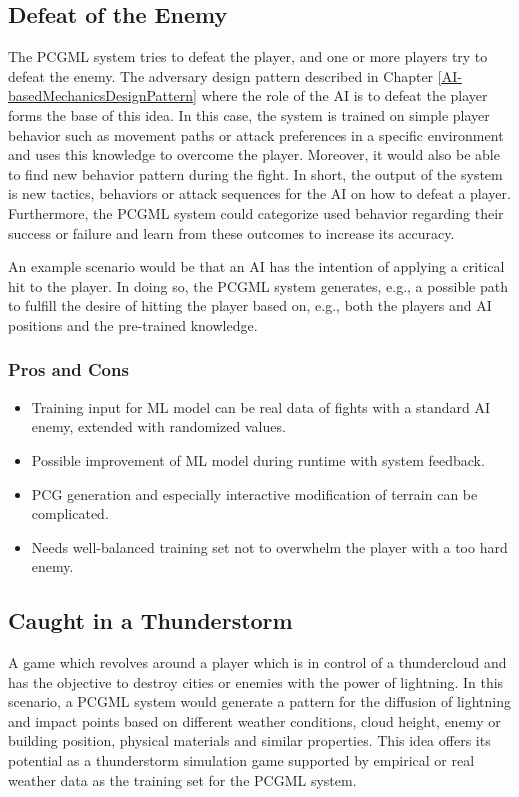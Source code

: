 \documentclass[MGS,Master,english]{twbook}%
\begin{document}
\subsection{Defeat of the Enemy} \label{idea::defeatTheEnemy}
The PCGML system tries to defeat the player, and one or more players try to defeat the enemy. The adversary design pattern described in Chapter \ref{AI-basedMechanicsDesignPattern} where the role of the AI is to defeat the player forms the base of this idea. In this case, the system is trained on simple player behavior such as movement paths or attack preferences in a specific environment and uses this knowledge to overcome the player. Moreover, it would also be able to find new behavior pattern during the fight. In short, the output of the system is new tactics, behaviors or attack sequences for the AI on how to defeat a player. Furthermore, the PCGML system could categorize used behavior regarding their success or failure and learn from these outcomes to increase its accuracy. 

An example scenario would be that an AI has the intention of applying a critical hit to the player. In doing so, the PCGML system generates, e.g., a possible path to fulfill the desire of hitting the player based on, e.g., both the players and AI positions and the pre-trained knowledge.

\subsubsection{Pros and Cons}
\begin{itemize}
	\item Training input for ML model can be real data of fights with a standard AI enemy, extended with randomized values.
	\item Possible improvement of ML model during runtime with system feedback.
	\item PCG generation and especially interactive modification of terrain can be complicated.
	\item Needs well-balanced training set not to overwhelm the player with a too hard enemy.
\end{itemize}


\subsection{Caught in a Thunderstorm} \label{idea::caughtInAThunderstorm}
A game which revolves around a player which is in control of a thundercloud and has the objective to destroy cities or enemies with the power of lightning. In this scenario, a PCGML system would generate a pattern for the diffusion of lightning and impact points based on different weather conditions, cloud height, enemy or building position, physical materials and similar properties. This idea offers its potential as a thunderstorm simulation game supported by empirical or real weather data as the training set for the PCGML system.
\end{document}
